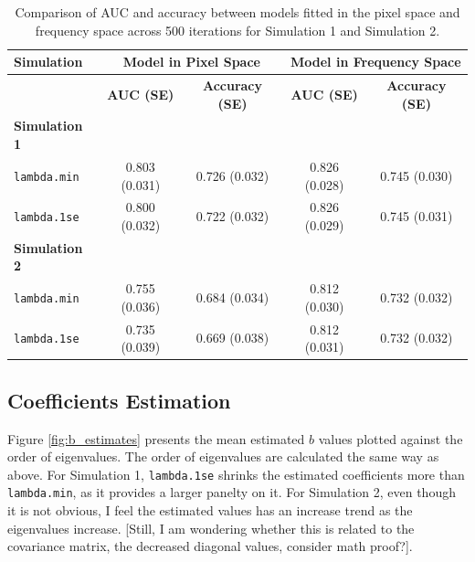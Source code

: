 \documentclass[12pt]{article}
\begin{document}
\begin{table}[H]
	\centering
	\caption{Comparison of AUC and accuracy between models fitted in the pixel space and frequency space across 500 iterations for Simulation 1 and Simulation 2.}
	\label{tab:auc_acc_table}
	\begin{tabular}{l|cc|cc}
		\toprule
		\textbf{Simulation}   & \multicolumn{2}{c}{\textbf{Model in Pixel Space}} & \multicolumn{2}{c}{\textbf{Model in Frequency Space}}                                              \\
		\midrule
		                      & \textbf{AUC (SE)}                                 & \textbf{Accuracy (SE)}                                & \textbf{AUC (SE)} & \textbf{Accuracy (SE)} \\
		\midrule
		\textbf{Simulation 1} &                                                   &                                                       &                   &                        \\
    \texttt{lambda.min}            & 0.803 (0.031)                                     & 0.726 (0.032)                                         & 0.826 (0.028)     & 0.745 (0.030)          \\
      \texttt{lambda.1se}            & 0.800 (0.032)                                     & 0.722 (0.032)                                         & 0.826 (0.029)     & 0.745 (0.031)          \\
		\midrule
		\textbf{Simulation 2} &                                                   &                                                       &                   &                        \\
    \texttt{lambda.min}            & 0.755 (0.036)                                     & 0.684 (0.034)                                         & 0.812 (0.030)     & 0.732 (0.032)          \\
      \texttt{lambda.1se}            & 0.735 (0.039)                                     & 0.669 (0.038)                                         & 0.812 (0.031)     & 0.732 (0.032)          \\
		\bottomrule
	\end{tabular}
\end{table}

\subsection*{Coefficients Estimation}

Figure \ref{fig:b_estimates} presents the mean estimated \( b \) values plotted against the order of eigenvalues. The order of eigenvalues are calculated the same way as above. For Simulation 1, \texttt{lambda.1se} shrinks the estimated coefficients more than \texttt{lambda.min}, as it provides a larger panelty on it. For Simulation 2, even though it is not obvious, I feel the estimated values has an increase trend as the eigenvalues increase. [Still, I am wondering whether this is related to the covariance matrix, the decreased diagonal values, consider math proof?].
\end{document}
